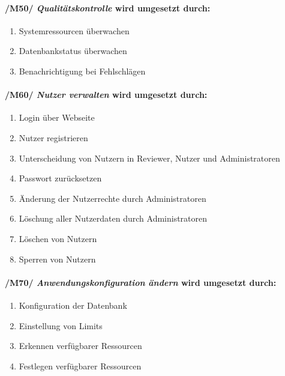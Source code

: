 \paragraph{/M50/ \textit{Qualitätskontrolle} wird umgesetzt durch:}

\begin{enumerate}
    \setlength\itemsep{-1em}
    \setcounter{enumi}{\value{FAs}}
    \item Systemressourcen überwachen %
    \item Datenbankstatus überwachen
    \item Benachrichtigung bei Fehlschlägen
    \setcounter{FAs}{\value{enumi}}
\end{enumerate}
    
\paragraph{/M60/ \textit{Nutzer verwalten} wird umgesetzt durch:}

\begin{enumerate}
    \setlength\itemsep{-1em}
    \setcounter{enumi}{\value{FAs}}
    \item Login über Webseite
    \item Nutzer registrieren
    \item Unterscheidung von Nutzern in Reviewer, Nutzer und Administratoren
    \item Passwort zurücksetzen
    \item Änderung der Nutzerrechte durch Administratoren
    \item Löschung aller Nutzerdaten durch Administratoren
    \item Löschen von Nutzern
    \item Sperren von Nutzern %
    \setcounter{FAs}{\value{enumi}}
\end{enumerate}
    
\paragraph{/M70/ \textit{Anwendungskonfiguration ändern} wird umgesetzt durch:}

\begin{enumerate}
    \setlength\itemsep{-1em}
    \setcounter{enumi}{\value{FAs}}
    \item Konfiguration der Datenbank
    \item Einstellung von Limits %
    \item Erkennen verfügbarer Ressourcen
    \item Festlegen verfügbarer Ressourcen
\end{enumerate}